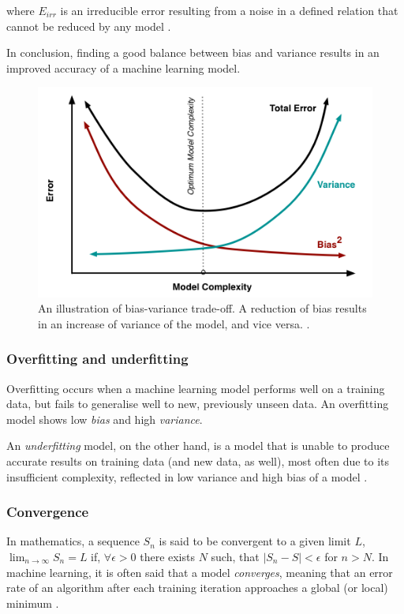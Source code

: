 where $E_{irr}$ is an irreducible error resulting from a noise in a defined relation that cannot be reduced by any model \cite{hastie:statisticallearning,fortmann-roe:biasvariance}. 

In conclusion, finding a good balance between bias and variance results in an improved accuracy of a machine learning model.

\begin{figure}[]
\centering
\includegraphics[scale=0.4]{figures/biasvariance.png}
\caption{An illustration of bias-variance trade-off. A reduction of bias results in an increase of variance of the model, and vice versa. \cite{fortmann-roe:biasvariance}.}
\end{figure}

\subsubsection{Overfitting and underfitting}

Overfitting occurs when a machine learning model performs well on a training data, but fails to generalise well to new, previously unseen data. An overfitting model shows low \emph{bias} and high \emph{variance}.

An \emph{underfitting} model, on the other hand, is a model that is unable to produce accurate results on training data (and new data, as well), most often due to its insufficient complexity, reflected in low variance and high bias of a model \cite{kai:overfitting}.

\subsubsection{Convergence}

In mathematics, a sequence $S_n$ is said to be convergent to a given limit $L$, $\lim_{n \to \infty} S_n = L$ if, $\forall \epsilon > 0$ there exists $N$ such, that $|S_n - S| < \epsilon$ for $n > N$. In machine learning, it is often said that a model \emph{converges}, meaning that an error rate of an algorithm after each training iteration approaches a global (or local) minimum \cite{convergence}.


